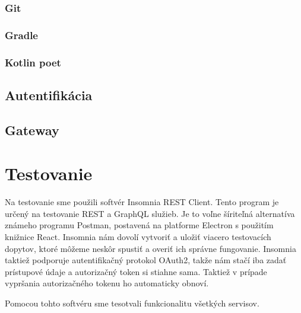 \subsubsection{Git}
\subsubsection{Gradle}
\subsubsection{Kotlin poet}


\subsection{Autentifikácia}
 
\subsection{Gateway} 




  

 

  

\section{Testovanie} 

 Na testovanie sme použili softvér Insomnia REST Client\cite{insomnia}. Tento program je určený na testovanie REST a GraphQL služieb. Je to voľne šíriteľná alternatíva známeho programu Postman, postavená na platforme Electron s použitím knižnice React. Insomnia nám dovolí vytvoriť a uložiť viacero testovacích dopytov, ktoré môžeme neskôr spustiť a overiť ich správne fungovanie. Insomnia taktiež podporuje autentifikačný protokol OAuth2, takže nám stačí iba zadať prístupové údaje a autorizačný token si stiahne sama. Taktiež v prípade vypršania autorizačného tokenu ho automaticky obnoví. 
 
 Pomocou tohto softvéru sme tesotvali funkcionalitu všetkých servisov.

